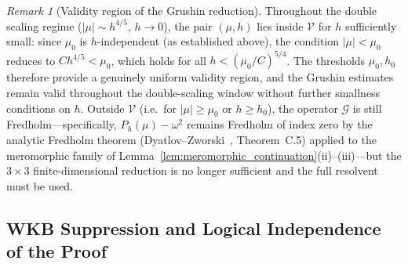 \documentclass[12pt,a4paper]{amsart}
\theoremstyle{remark}
\newtheorem{remark}[theorem]{Remark}
\begin{document}
\begin{remark}[Validity region of the Grushin reduction]
Throughout the double scaling regime ($|\mu| \sim h^{4/5}$, $h \to 0$), the pair $(\mu,h)$
lies inside $\mathcal{V}$ for $h$ sufficiently small: since $\mu_0$ is $h$-independent (as
established above), the condition $|\mu| < \mu_0$ reduces to $Ch^{4/5} < \mu_0$, which holds
for all $h < ({\mu_0}/{C})^{5/4}$.  The thresholds $\mu_0, h_0$ therefore provide a
genuinely uniform validity region, and the Grushin estimates remain valid throughout the
double-scaling window without further smallness conditions on $h$.
Outside $\mathcal{V}$ (i.e.\ for $|\mu| \geq \mu_0$ or $h \geq h_0$), the operator
$\mathcal{G}$ is still Fredholm---specifically, $P_h(\mu) - \omega^2$ remains Fredholm
of index zero by the analytic Fredholm theorem (Dyatlov--Zworski~\cite{DZ19},
Theorem~C.5) applied to the meromorphic family of
Lemma~\ref{lem:meromorphic_continuation}(ii)--(iii)---but the $3\times 3$ finite-dimensional
reduction is no longer sufficient and the full resolvent must be used.
\end{remark}


\subsection{WKB Suppression and Logical Independence of the Proof}
\label{sec:wkb_suppression}
\end{document}
